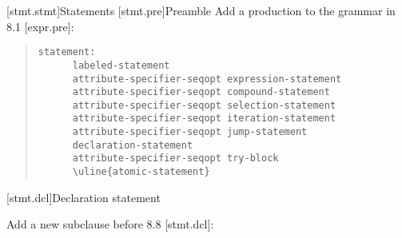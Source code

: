 [stmt.stmt]{Statements}
[stmt.pre]{Preamble}  
\pnum
Add a production to the grammar in 8.1 {[}expr.pre{]}:

\begin{quote}
\begin{verbatim}
statement:
      labeled-statement
      attribute-specifier-seqopt expression-statement
      attribute-specifier-seqopt compound-statement
      attribute-specifier-seqopt selection-statement
      attribute-specifier-seqopt iteration-statement
      attribute-specifier-seqopt jump-statement
      declaration-statement
      attribute-specifier-seqopt try-block
      \uline{atomic-statement}
\end{verbatim}
\end{quote}

[stmt.dcl]{Declaration statement}  

\pnum
Add a new subclause before 8.8 {[}stmt.dcl{]}:

